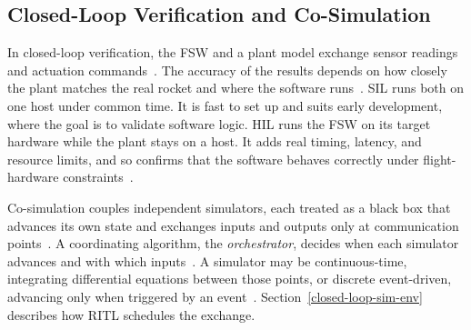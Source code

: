 \subsection{Closed-Loop Verification and Co-Simulation}\label{background-cosim}
In closed-loop verification, the FSW and a plant model exchange sensor readings and actuation commands~\cite{ulbig2019flightsimulatorbasedverification}. The accuracy of the results depends on how closely the plant matches the real rocket and where the software runs~\cite{ulbig2019flightsimulatorbasedverification, kiesbye2019-moveII-cubsat}. SIL runs both on one host under common time. It is fast to set up and suits early development, where the goal is to validate software logic. HIL runs the FSW on its target hardware while the plant stays on a host. It adds real timing, latency, and resource limits, and so confirms that the software behaves correctly under flight-hardware constraints~\cite{kiesbye2019-moveII-cubsat, santos-hil-uav-autopilot}.

Co-simulation couples independent simulators, each treated as a black box that advances its own state and exchanges inputs and outputs only at communication points~\cite{gomes2017cosimulation}. A coordinating algorithm, the \emph{orchestrator}, decides when each simulator advances and with which inputs~\cite{gomes2017cosimulation}. A simulator may be continuous-time, integrating differential equations between those points, or discrete event-driven, advancing only when triggered by an event~\cite{gomes2017cosimulation}. Section~\ref{closed-loop-sim-env} describes how RITL schedules the exchange.
